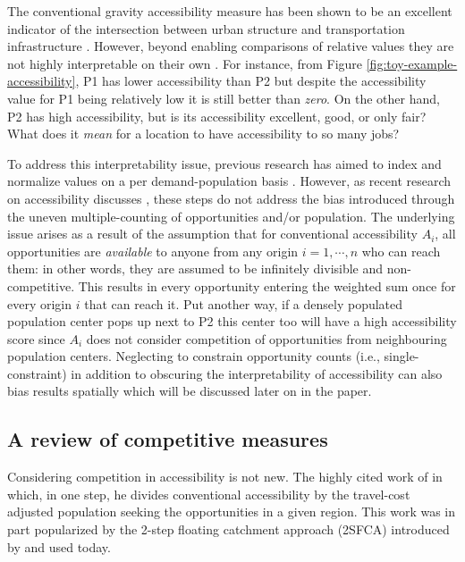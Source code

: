 \documentclass[]{elsarticle} %
\begin{document}
The conventional gravity accessibility measure has been shown to be an
excellent indicator of the intersection between urban structure and
transportation infrastructure
\citep{shi_literature_2020, reggiani_accessibility_2011, kwan_spacetime_1998}.
However, beyond enabling comparisons of relative values they are not
highly interpretable on their own \citep{miller2018}. For instance, from
Figure \ref{fig:toy-example-accessibility}, P1 has lower accessibility
than P2 but despite the accessibility value for P1 being relatively low
it is still better than \emph{zero}. On the other hand, P2 has high
accessibility, but is its accessibility excellent, good, or only fair?
What does it \emph{mean} for a location to have accessibility to so many
jobs?

To address this interpretability issue, previous research has aimed to
index and normalize values on a per demand-population basis
\citep[e.g.,][]{barboza_balancing_2021, pereira_distributional_2019, wang_access_2021}.
However, as recent research on accessibility discusses
\citep{allen2019, paez2019}, these steps do not address the bias
introduced through the uneven multiple-counting of opportunities and/or
population. The underlying issue arises as a result of the assumption
that for conventional accessibility \(A_i\), all opportunities are
\emph{available} to anyone from any origin \(i=1,\cdots,n\) who can
reach them: in other words, they are assumed to be infinitely divisible
and non-competitive. This results in every opportunity entering the
weighted sum once for every origin \(i\) that can reach it. Put another
way, if a densely populated population center pops up next to P2 this
center too will have a high accessibility score since \(A_i\) does not
consider competition of opportunities from neighbouring population
centers. Neglecting to constrain opportunity counts (i.e.,
single-constraint) in addition to obscuring the interpretability of
accessibility can also bias results spatially which will be discussed
later on in the paper.

\hypertarget{a-review-of-competitive-measures}{%
\subsection{A review of competitive
measures}\label{a-review-of-competitive-measures}}

Considering competition in accessibility is not new. The highly cited
work of \citeyearpar{shen1998} in which, in one step, he divides
conventional accessibility by the travel-cost adjusted population
seeking the opportunities in a given region. This work was in part
popularized by the 2-step floating catchment approach (2SFCA) introduced
by \citeyearpar{luo2003} and used today.
\end{document}
